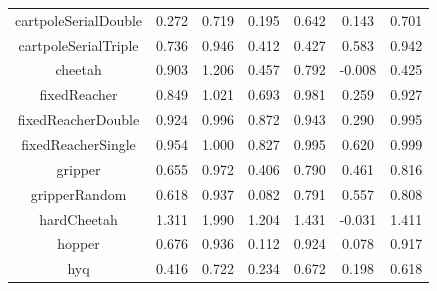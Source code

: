 \documentclass{article} %
\begin{document}
\begin{table}[t]
\begin{center}
\begin{tabular}{ c | c | c | c | c | c | c }
      cartpoleSerialDouble & 0.272 & 0.719 & 0.195 & 0.642 & 0.143 & 0.701 \\
      cartpoleSerialTriple & 0.736 & 0.946 & 0.412 & 0.427 & 0.583 & 0.942 \\
      cheetah & 0.903 & 1.206 & 0.457 & 0.792 & -0.008 & 0.425 \\
      fixedReacher & 0.849 & 1.021 & 0.693 & 0.981 & 0.259 & 0.927 \\
      fixedReacherDouble & 0.924 & 0.996 & 0.872 & 0.943 & 0.290 & 0.995 \\
      fixedReacherSingle & 0.954 & 1.000 & 0.827 & 0.995 & 0.620 & 0.999 \\
      gripper & 0.655 & 0.972 & 0.406 & 0.790 & 0.461 & 0.816 \\
      gripperRandom & 0.618 & 0.937 & 0.082 & 0.791 & 0.557 & 0.808 \\
      hardCheetah & 1.311 & 1.990 & 1.204 & 1.431 & -0.031 & 1.411 \\
      hopper & 0.676 & 0.936 & 0.112 & 0.924 & 0.078 & 0.917 \\
      hyq & 0.416 & 0.722 & 0.234 & 0.672 & 0.198 & 0.618 \\

\end{tabular}
\end{center}
\end{table}
\end{document}
